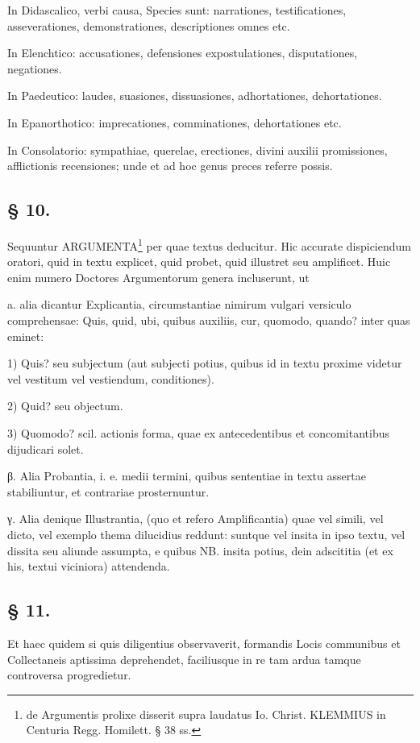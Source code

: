 In Didascalico, verbi causa, Species sunt: narrationes, testificationes, asseverationes, demonstrationes, descriptiones omnes etc.

In Elenchtico: accusationes, defensiones expostulationes, disputationes, negationes.

In Paedeutico: laudes, suasiones, dissuasiones, adhortationes, dehortationes.

In Epanorthotico: imprecationes, comminationes, dehortationes etc.

In Consolatorio: sympathiae, querelae, erectiones, divini auxilii promissiones, afflictionis recensiones; unde et ad hoc genus preces referre possis.

\subsection*{§ 10.}

Sequuntur ARGUMENTA\footnote{de Argumentis prolixe disserit supra laudatus Io. Christ. KLEMMIUS in Centuria Regg. Homilett. § 38 ss.} per quae textus deducitur. Hic accurate dispiciendum oratori, quid in textu explicet, quid probet, quid illustret seu amplificet. Huic enim numero Doctores Argumentorum genera incluserunt, ut

a. alia dicantur Explicantia, circumstantiae nimirum vulgari versiculo comprehensae: Quis, quid, ubi, quibus auxiliis, cur, quomodo, quando? inter quas eminet:

1) Quis? seu subjectum (aut subjecti potius, quibus id in textu proxime videtur vel vestitum vel vestiendum, conditiones).

2) Quid? seu objectum.

3) Quomodo? scil. actionis forma, quae ex antecedentibus et concomitantibus dijudicari solet.

β. Alia Probantia, i. e. medii termini, quibus sententiae in textu assertae stabiliuntur, et contrariae prosternuntur.

γ. Alia denique Illustrantia, (quo et refero Amplificantia) quae vel simili, vel dicto, vel exemplo thema dilucidius reddunt: suntque vel insita in ipso textu, vel dissita seu aliunde assumpta, e quibus NB. insita potius, dein adscititia (et ex his, textui viciniora) attendenda.

\subsection*{§ 11.}

Et haec quidem si quis diligentius observaverit, formandis Locis communibus et Collectaneis aptissima deprehendet, faciliusque in re tam ardua tamque controversa progredietur.

